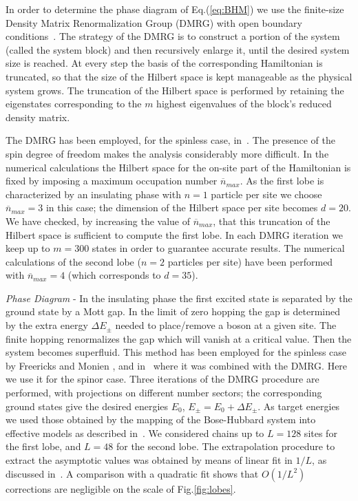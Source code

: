 \documentclass[prl,twocolumn,superscriptaddress,showpacs,floatfix]{revtex4}
\begin{document}
In order to determine the phase diagram of Eq.(\ref{eq:BHM}) we use
the finite-size Density Matrix Renormalization Group (DMRG) with open boundary 
conditions~\cite{white92-95}.
The strategy of the DMRG is to construct a portion of the system
(called the system block) and then recursively enlarge it, until
the desired system size is reached.
At every step the basis of the corresponding Hamiltonian is truncated, so that
the size of the Hilbert space is kept manageable as the physical system grows.
The truncation of the Hilbert space is performed by retaining the eigenstates
corresponding to the $m$ highest eigenvalues of the block's reduced
density matrix.

The DMRG has been employed, for the spinless case, in~\cite{kuhner98,kuhner00}.
The presence of the spin degree of freedom makes 
the analysis considerably more difficult. In the numerical calculations the 
Hilbert space for the on-site part of the Hamiltonian is fixed by imposing a 
maximum occupation number $\overline{n}_{max}$.
As the first lobe is characterized by an insulating phase with $n=1$ particle
per site we choose $\overline{n}_{max} = 3$ in this case;
the dimension of the Hilbert space per site becomes $d=20$.
We have checked, by increasing the value of  $\overline{n}_{max}$,
that this truncation of the Hilbert space is sufficient to compute
the first lobe. In each DMRG iteration we keep up to $m=300$ states
in order to guarantee accurate results. The numerical calculations of the
second lobe ($n=2$ particles per site) have been performed with
$\overline{n}_{max} = 4$ (which corresponds to $d=35$).

{\em Phase Diagram } - 
In the insulating phase the first excited state is separated
by the ground state by a Mott gap. In the limit of zero hopping
the gap is determined by the extra energy $\Delta E_\pm$ needed
to place/remove a boson at a given site. The finite hopping renormalizes the
gap which will vanish at a critical value. Then the system becomes superfluid.
This method has been employed for the spinless case by Freericks and Monien
\cite{freericks96}, and in~\cite{kuhner98,kuhner00} where it was combined
with the DMRG. Here we use it for the spinor case.
Three iterations of the DMRG procedure are performed, with projections 
on different number sectors; the corresponding ground states give the desired
energies $E_0$, $E_\pm = E_0 + \Delta E_\pm$.
As target energies we used those obtained by the mapping of the Bose-Hubbard
system into effective models as described in~\cite{imambekov03}.
We considered chains up to $L=128$ sites for the first lobe, and $L=48$ for
the second lobe.
The extrapolation procedure to extract the asymptotic values was obtained
by means of linear fit in $1/L$, as discussed in~\cite{kuhner00}.
A comparison with a quadratic fit shows that $O(1/L^2)$ corrections are
negligible on the scale of Fig.\ref{fig:lobes}.
\end{document}
